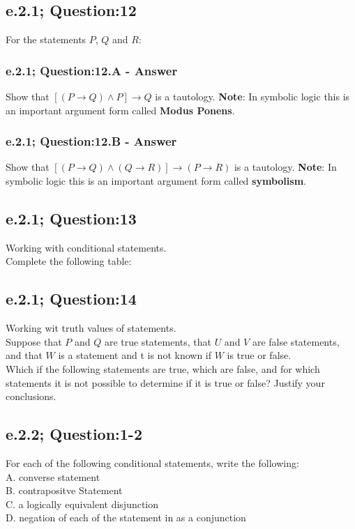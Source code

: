 \subsection{e.2.1; Question:12}
For the statements $P$, $Q$ and $R$: \\

\subsubsection*{e.2.1; Question:12.A - Answer}
Show that $[(P \to Q)\wedge P] \to Q$ is a tautology. {\bf Note}: In symbolic logic this is an important argument form called {\bf Modus Ponens}.

\subsubsection*{e.2.1; Question:12.B - Answer}
Show that $[(P \to Q)\wedge (Q \to R)] \to (P \to R)$ is a tautology. {\bf Note}: In symbolic logic this is an important argument form called {\bf symbolism}.

\subsection{e.2.1; Question:13}
Working with conditional statements. \\
Complete the following table: \\


\subsection{e.2.1; Question:14}
Working wit truth values of statements. \\
Suppose that $P$ and $Q$ are true statements, that $U$ and $V$ are false statements, and that $W$ is a statement and t is not known if $W$ is true or false. \\
Which if the following statements are true, which are false, and for which statements it is not possible to determine if it is true or false? Justify your conclusions. \\ 

\subsection{e.2.2; Question:1-2}
For each of the following conditional statements, write the following: \\
A. converse statement  \\
B. contrapositve Statement \\
C. a logically equivalent disjunction \\
D. negation of each of the statement in as a conjunction \\

